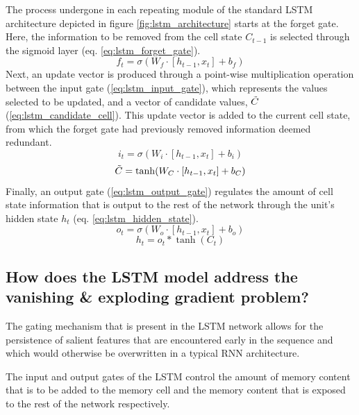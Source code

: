 \documentclass[12pt, a4paper]{report}
\theoremstyle{definition}
\theoremstyle{definition}%
\theoremstyle{definition}%
\theoremstyle{definition}%
\theoremstyle{definition}%
\theoremstyle{definition}%
\begin{document}
The process undergone in each repeating module of the standard LSTM architecture depicted in figure \ref{fig:lstm_architecture} starts at the forget gate. Here, the information to be removed from the cell state $C_{t-1}$ is selected through the sigmoid layer (eq. \ref{eq:lstm_forget_gate}). 
\begin{equation} \label{eq:lstm_forget_gate}
    f_t = \sigma(W_f\cdot[h_{t-1},x_t] + b_f)
\end{equation}
Next, an update vector is produced through a point-wise multiplication operation between the input gate (\ref{eq:lstm_input_gate}), which represents the values selected to be updated, and a vector of candidate values, $\Tilde{C}$ (\ref{eq:lstm_candidate_cell}). This update vector is added to the current cell state, from which the forget gate had previously removed information deemed redundant. 
\begin{equation} \label{eq:lstm_input_gate}
    i_t = \sigma(W_i\cdot[h_{t-1},x_t] + b_i)
\end{equation}
\begin{equation} \label{eq:lstm_candidate_cell}
   \Tilde{C} = \tanh(W_C\cdot[h_{t-1},x_t] + b_C)
\end{equation}
Finally, an output gate (\ref{eq:lstm_output_gate}) regulates the amount of cell state information that is output to the rest of the network through the unit's hidden state $h_t$ (eq. \ref{eq:lstm_hidden_state}). 
\begin{equation} \label{eq:lstm_output_gate}
    o_t = \sigma(W_o\cdot[h_{t-1},x_t] + b_o)
\end{equation}
\begin{equation} \label{eq:lstm_hidden_state}
    h_t = o_t*\tanh(C_t)
\end{equation}

\subsection{How does the LSTM model address the  vanishing \& exploding gradient problem?}
The gating mechanism that is present in the LSTM network allows for the persistence of salient features that are encountered early in the sequence and which would otherwise be overwritten in a typical RNN architecture.

The input and output gates of the LSTM control the amount of memory content that is to be added to the memory cell and the memory content that is exposed to the rest of the network respectively.
\end{document}
